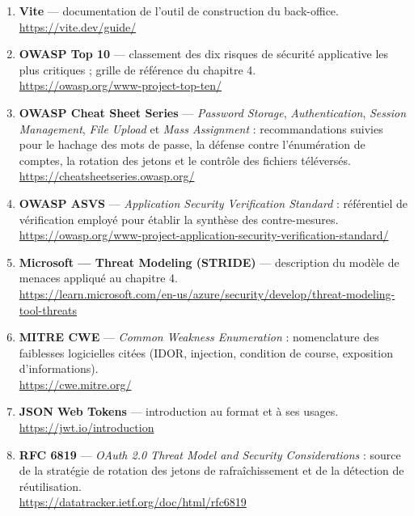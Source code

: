 \begin{enumerate}[leftmargin=1.1cm,itemsep=6pt]
  \item \textbf{Vite} --- documentation de l'outil de construction du
  back-office.
  \\ \url{https://vite.dev/guide/}

  \item \textbf{OWASP Top 10} --- classement des dix risques de sécurité
  applicative les plus critiques ; grille de référence du chapitre 4.
  \\ \url{https://owasp.org/www-project-top-ten/}

  \item \textbf{OWASP Cheat Sheet Series} --- \textit{Password Storage},
  \textit{Authentication}, \textit{Session Management}, \textit{File Upload} et
  \textit{Mass Assignment} : recommandations suivies pour le hachage des mots de
  passe, la défense contre l'énumération de comptes, la rotation des jetons et
  le contrôle des fichiers téléversés.
  \\ \url{https://cheatsheetseries.owasp.org/}

  \item \textbf{OWASP ASVS} --- \textit{Application Security Verification
  Standard} : référentiel de vérification employé pour établir la synthèse des
  contre-mesures.
  \\ \url{https://owasp.org/www-project-application-security-verification-standard/}

  \item \textbf{Microsoft --- Threat Modeling (STRIDE)} --- description du
  modèle de menaces appliqué au chapitre 4.
  \\ \url{https://learn.microsoft.com/en-us/azure/security/develop/threat-modeling-tool-threats}

  \item \textbf{MITRE CWE} --- \textit{Common Weakness Enumeration} :
  nomenclature des faiblesses logicielles citées (IDOR, injection, condition de
  course, exposition d'informations).
  \\ \url{https://cwe.mitre.org/}

  \item \textbf{JSON Web Tokens} --- introduction au format et à ses usages.
  \\ \url{https://jwt.io/introduction}

  \item \textbf{RFC 6819} --- \textit{OAuth 2.0 Threat Model and Security
  Considerations} : source de la stratégie de rotation des jetons de
  rafraîchissement et de la détection de réutilisation.
  \\ \url{https://datatracker.ietf.org/doc/html/rfc6819}


\end{enumerate}
